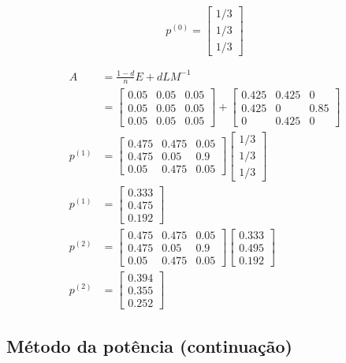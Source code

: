 \documentclass[
  letterpaper,
  DIV=11,
  numbers=noendperiod]{scrartcl}
\begin{document}
\[ p^{(0)} = \begin{bmatrix}1/3\\1/3\\1/3\end{bmatrix}\]

\begin{align}
A &= \frac{1-d}{n}E + dLM^{-1}\\
&= \begin{bmatrix}0.05 & 0.05 & 0.05\\0.05 &0.05&0.05\\0.05&0.05&0.05\end{bmatrix} + \begin{bmatrix}0.425 & 0.425&0\\0.425&0&0.85\\0&0.425&0\end{bmatrix}\\
p^{(1)} &= \begin{bmatrix}0.475&0.475&0.05\\0.475&0.05&0.9\\0.05&0.475&0.05\end{bmatrix}\begin{bmatrix}1/3\\1/3\\1/3\end{bmatrix}\\
p^{(1)}&= \begin{bmatrix}0.333\\0.475\\0.192\end{bmatrix}\\
p^{(2)} &= \begin{bmatrix}0.475&0.475&0.05\\0.475&0.05&0.9\\0.05&0.475&0.05\end{bmatrix}\begin{bmatrix}0.333\\0.495\\0.192\end{bmatrix}\\
p^{(2)}&= \begin{bmatrix}0.394\\0.355\\0.252\end{bmatrix}
\end{align}

\hypertarget{muxe9todo-da-potuxeancia-continuauxe7uxe3o}{%
\subsection{Método da potência
(continuação)}\label{muxe9todo-da-potuxeancia-continuauxe7uxe3o}}
\end{document}
